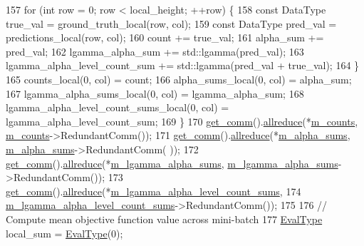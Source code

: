 \begin{DoxyCode}
157     \textcolor{keywordflow}{for} (\textcolor{keywordtype}{int} row = 0; row < local\_height; ++row) \{
158       \textcolor{keyword}{const} DataType true\_val = ground\_truth\_local(row, col);
159       \textcolor{keyword}{const} DataType pred\_val = predictions\_local(row, col);
160       count += true\_val;
161       alpha\_sum += pred\_val;
162       lgamma\_alpha\_sum += std::lgamma(pred\_val);
163       lgamma\_alpha\_level\_count\_sum += std::lgamma(pred\_val + true\_val);
164     \}
165     counts\_local(0, col) = count;
166     alpha\_sums\_local(0, col) = alpha\_sum;
167     lgamma\_alpha\_sums\_local(0, col) = lgamma\_alpha\_sum;
168     lgamma\_alpha\_level\_count\_sums\_local(0, col) = lgamma\_alpha\_level\_count\_sum;
169   \}
170   \hyperlink{classlbann_1_1objective__function__term_a5f89b676a26a6b76ddc26563ac87beb9}{get\_comm}().\hyperlink{classlbann_1_1lbann__comm_af5631e5f0f54e4df4958eba9df2599ef}{allreduce}(*\hyperlink{classlbann_1_1polya__negloglike_a441387814cd7deafb1f70c91926d3004}{m\_counts}, \hyperlink{classlbann_1_1polya__negloglike_a441387814cd7deafb1f70c91926d3004}{m\_counts}->RedundantComm());
171   \hyperlink{classlbann_1_1objective__function__term_a5f89b676a26a6b76ddc26563ac87beb9}{get\_comm}().\hyperlink{classlbann_1_1lbann__comm_af5631e5f0f54e4df4958eba9df2599ef}{allreduce}(*\hyperlink{classlbann_1_1polya__negloglike_aa77620f256de700ae8b3ca921957bcd1}{m\_alpha\_sums}, \hyperlink{classlbann_1_1polya__negloglike_aa77620f256de700ae8b3ca921957bcd1}{m\_alpha\_sums}->RedundantComm(
      ));
172   \hyperlink{classlbann_1_1objective__function__term_a5f89b676a26a6b76ddc26563ac87beb9}{get\_comm}().\hyperlink{classlbann_1_1lbann__comm_af5631e5f0f54e4df4958eba9df2599ef}{allreduce}(*\hyperlink{classlbann_1_1polya__negloglike_a0aec768ffa50a8b716149d597699eddb}{m\_lgamma\_alpha\_sums}, 
      \hyperlink{classlbann_1_1polya__negloglike_a0aec768ffa50a8b716149d597699eddb}{m\_lgamma\_alpha\_sums}->RedundantComm());
173   \hyperlink{classlbann_1_1objective__function__term_a5f89b676a26a6b76ddc26563ac87beb9}{get\_comm}().\hyperlink{classlbann_1_1lbann__comm_af5631e5f0f54e4df4958eba9df2599ef}{allreduce}(*\hyperlink{classlbann_1_1polya__negloglike_a78c9da1fb83c7b79a12cfbf30a4cb59e}{m\_lgamma\_alpha\_level\_count\_sums},
174                         \hyperlink{classlbann_1_1polya__negloglike_a78c9da1fb83c7b79a12cfbf30a4cb59e}{m\_lgamma\_alpha\_level\_count\_sums}->RedundantComm());
175 
176   \textcolor{comment}{// Compute mean objective function value across mini-batch}
177   \hyperlink{base_8hpp_a3266f5ac18504bbadea983c109566867}{EvalType} local\_sum = \hyperlink{base_8hpp_a3266f5ac18504bbadea983c109566867}{EvalType}(0);

\end{DoxyCode}
